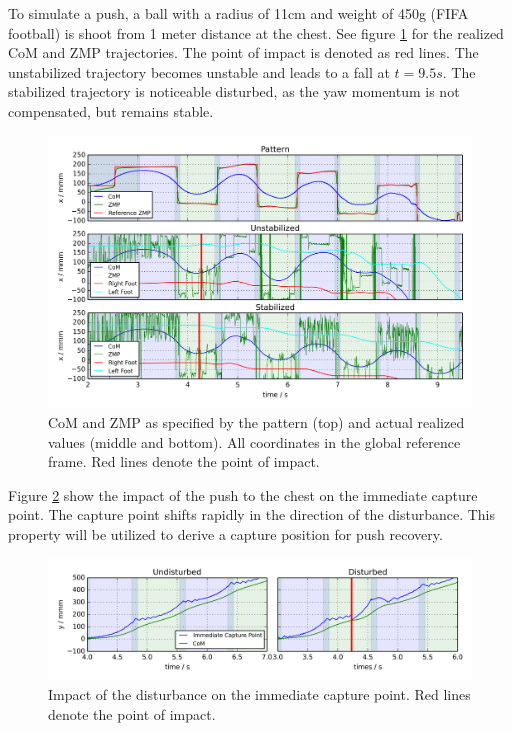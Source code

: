 \documentclass[english,ngerman]{KITreprt}
\begin{document}
To simulate a push, a ball with a radius of 11cm and weight of 450g
(FIFA football) is shoot from 1 meter distance at the chest. See figure
\ref{img:disturbed-straight-x} for the realized CoM and ZMP
trajectories. The point of impact is denoted as red lines. The
unstabilized trajectory becomes unstable and leads to a fall at
$t = 9.5s$. The stabilized trajectory is noticeable disturbed, as the
yaw momentum is not compensated, but remains stable.

\begin{figure}[hbt]
\vspace*{-1em}
\includegraphics[width=\textwidth,resolution=300]{images/disturbed_straight_x.png}
\caption{CoM and ZMP as specified by the pattern (top) and actual realized values (middle and bottom).
All coordinates in the global reference frame. Red lines denote the point of impact.}
\label{img:disturbed-straight-x}
\end{figure}

Figure \ref{img:cp-disturbance-front-y} show the impact of the push to
the chest on the immediate capture point. The capture point shifts
rapidly in the direction of the disturbance. This property will be
utilized to derive a capture position for push recovery.

\begin{figure}[hbt]
\vspace*{-1em}
\includegraphics[width=\textwidth,resolution=300]{images/cp_disturbance_front_y.png}
\caption{Impact of the disturbance on the immediate capture point. Red lines denote the point of impact.}
\label{img:cp-disturbance-front-y}
\end{figure}
\end{document}
